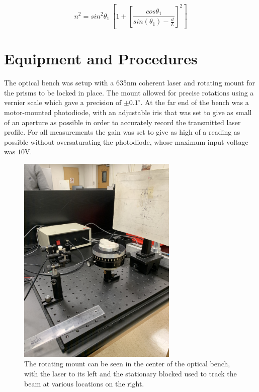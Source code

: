 \documentclass[colorlinks=true,pdfstartview=FitV,linkcolor=blue,
            citecolor=red,urlcolor=magenta]{basedoc}
\begin{document}
  \begin{equation} \label{eq:ind_refr_ang_refr}
      n^2 = sin^2 \theta_1 \ [1 + \left[ \frac {cos\theta_1} {sin(\theta_1) - \frac{d}{L} } \right] ^2 ]
  \end{equation}


\section{Equipment and Procedures}

  The optical bench was setup with a 635nm coherent laser and rotating mount for the prisms to be locked in place. The mount allowed for precise rotations using a vernier scale which gave a precision of $\pm0.1^{\circ}$. At the far end of the bench was a motor-mounted photodiode, with an adjustable iris that was set to give as small of an aperture as possible in order to accurately record the transmitted laser profile. For all measurements the gain was set to give as high of a reading as possible without oversaturating the photodiode, whose maximum input voltage was $10$V.

    \begin{figure}[!h]
      \begin{center}
      \includegraphics[angle=270,width=3in]{resources/prism_mount.jpeg}
      \caption{The rotating mount can be seen in the center of the optical bench, with the laser to its left and the stationary blocked used to track the beam at various locations on the right.}
      \label{fig:prism_mount}
      \end{center}
    \end{figure}
\end{document}

